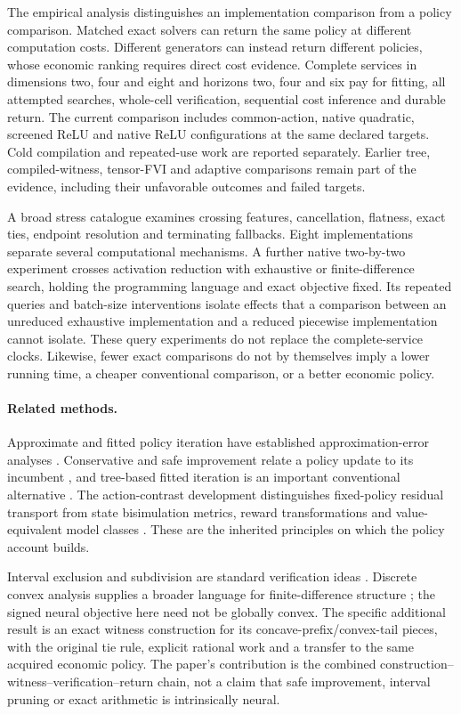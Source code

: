 The empirical analysis distinguishes an implementation comparison from a policy comparison. Matched exact solvers can return the same policy at different computation costs. Different generators can instead return different policies, whose economic ranking requires direct cost evidence. Complete services in dimensions two, four and eight and horizons two, four and six pay for fitting, all attempted searches, whole-cell verification, sequential cost inference and durable return. The current comparison includes common-action, native quadratic, screened ReLU and native ReLU configurations at the same declared targets. Cold compilation and repeated-use work are reported separately. Earlier tree, compiled-witness, tensor-FVI and adaptive comparisons remain part of the evidence, including their unfavorable outcomes and failed targets.

A broad stress catalogue examines crossing features, cancellation, flatness, exact ties, endpoint resolution and terminating fallbacks. Eight implementations separate several computational mechanisms. A further native two-by-two experiment crosses activation reduction with exhaustive or finite-difference search, holding the programming language and exact objective fixed. Its repeated queries and batch-size interventions isolate effects that a comparison between an unreduced exhaustive implementation and a reduced piecewise implementation cannot isolate. These query experiments do not replace the complete-service clocks. Likewise, fewer exact comparisons do not by themselves imply a lower running time, a cheaper conventional comparison, or a better economic policy.

\paragraph{Related methods.}
Approximate and fitted policy iteration have established approximation-error analyses \citep{munos2003,munos2008,scherrer2015}. Conservative and safe improvement relate a policy update to its incumbent \citep{kakade2002,pirotta2013,metelli2021}, and tree-based fitted iteration is an important conventional alternative \citep{ernst2005}. The action-contrast development distinguishes fixed-policy residual transport from state bisimulation metrics, reward transformations and value-equivalent model classes \citep{ferns2004,ng1999,grimm2020}. These are the inherited principles on which the policy account builds.

Interval exclusion and subdivision are standard verification ideas \citep{moore2009}. Discrete convex analysis supplies a broader language for finite-difference structure \citep{murota2003}; the signed neural objective here need not be globally convex. The specific additional result is an exact witness construction for its concave-prefix/convex-tail pieces, with the original tie rule, explicit rational work and a transfer to the same acquired economic policy. The paper's contribution is the combined construction--witness--verification--return chain, not a claim that safe improvement, interval pruning or exact arithmetic is intrinsically neural.

